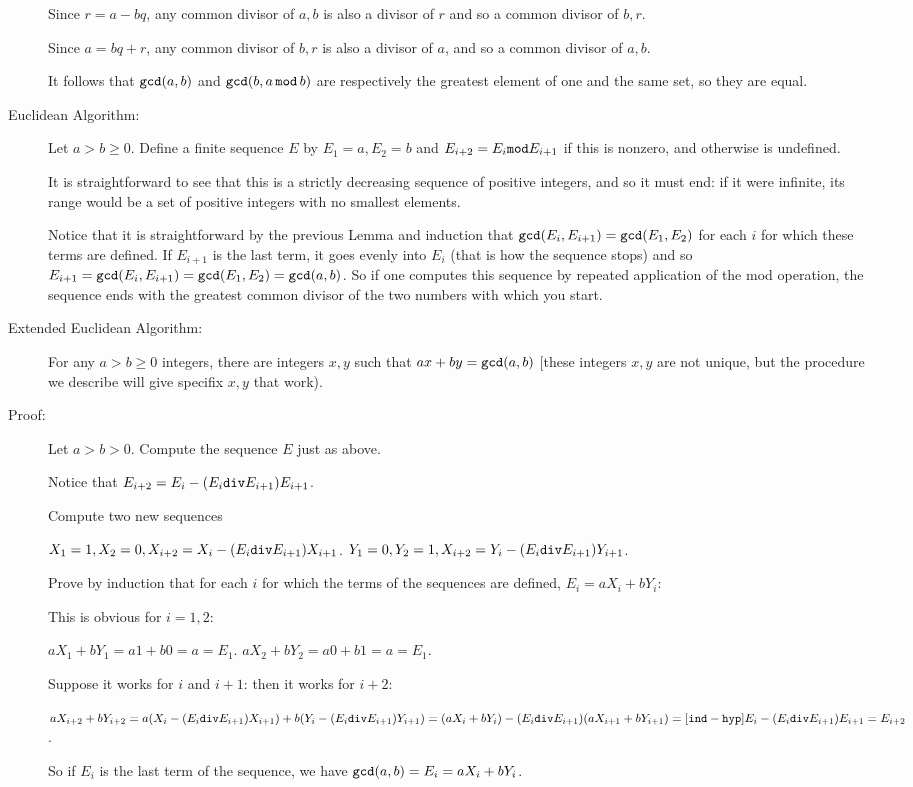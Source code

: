 \documentclass[12pt]{article}
\begin{document}
\begin{description}
Since $r=a-bq$, any common divisor of $a,b$ is also a divisor of $r$ and so a common divisor of $b,r$.

Since $a=bq+r$, any common divisor of $b,r$ is also a divisor of $a$, and so a common divisor of $a,b$.

It follows that ${\tt gcd}(a,b)$ and ${\tt gcd}(b,a\,{\tt mod}\,b)$ are respectively the greatest element of one and the same set, so they are equal.

\item[Euclidean Algorithm:]

Let $a>b\geq 0$.  Define a finite sequence $E$ by $E_1=a, E_2=b$ and $E_{i+2}= E_i {\tt mod} E_{i+1}$ if this is nonzero, and otherwise is undefined.

It is straightforward to see that this is a strictly decreasing sequence of positive integers, and so it must end:  if it were infinite, its range would be a set of positive integers with no smallest elements.

Notice that it is straightforward by the previous Lemma and induction that ${\tt gcd}(E_i,E_{i+1}) = {\tt gcd}(E_1,E_2)$ for each $i$ for which these terms are defined.  If $E_{i+1}$ is the last term, it goes evenly into $E_i$ (that is how the sequence stops) and so $E_{i+1}={\tt gcd}(E_i,E_{i+1}) = {\tt gcd}(E_1,E_2)= {\tt gcd}(a,b)$.  So if one computes this sequence by repeated application of the mod operation, the sequence ends with the greatest common divisor of the two numbers with which you start.

\item[Extended Euclidean Algorithm:]  For any $a>b\geq0$ integers, there are integers $x,y$ such that $ax+by={\tt gcd}(a,b)$ [these integers $x,y$ are not unique, but the procedure we describe will give specifix $x,y$ that work).

\item[Proof:]  Let $a>b>0$.  Compute the sequence $E$ just as above.  

Notice that $E_{i+2}= E_i - (E_i {\tt div}E_{i+1})E_{i+1}$.

Compute two new sequences

$X_1=1, X_2=0, X_{i+2}= X_i - (E_i {\tt div}E_{i+1})X_{i+1}$.
$Y_1=0, Y_2=1, X_{i+2}= Y_i - (E_i {\tt div}E_{i+1})Y_{i+1}$.

Prove by induction that for each $i$ for which the terms of the sequences are defined, $E_i = aX_i + bY_i$:

This is obvious for $i=1,2$:

$aX_1+bY_1 = a1+b0 = a = E_1$.
$aX_2+bY_2 = a0+b1 = a = E_1$.

Suppose it works for $i$ and $i+1$:  then it works for $i+2$:

$aX_{i+2} +bY_{i+2} = a(X_i - (E_i {\tt div}E_{i+1})X_{i+1}) + b(Y_i - (E_i {\tt div}E_{i+1})Y_{i+1}) = (aX_i+bY_i) - (E_i {\tt div}E_{i+1})(aX_{i+1}+bY_{i+1}) =[{\tt ind-hyp}] E_i - (E_i {\tt div}E_{i+1})E_{i+1} = E_{i+2}$.

So if $E_i$ is the last term of the sequence, we have ${\tt gcd}(a,b)=E_i = aX_i +bY_i$.


\end{description}
\end{document}

